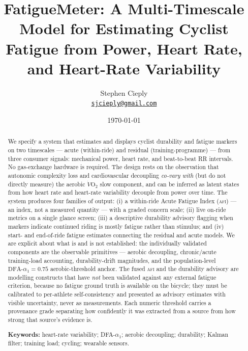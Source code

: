 \documentclass[11pt]{article}
\title{\vspace{-1.5em}\bfseries\color{ink}\LARGE FatigueMeter: A Multi-Timescale Model for Estimating Cyclist Fatigue from Power, Heart Rate, and Heart-Rate Variability}
\author{%
  \normalsize Stephen Cieply\\[2pt]
  \small\texttt{\href{mailto:sjcieply@gmail.com}{sjcieply@gmail.com}}%
}
\date{\today}
\newcommand{\afi}{\textup{\textsc{afi}}}
\newcommand{\aone}{\ensuremath{\text{DFA-}\alpha_1}}
\begin{document}
\maketitle

\begin{abstract}
\noindent We specify a system that estimates and displays cyclist durability and fatigue markers on two timescales --- acute (within-ride) and residual (training-programme) --- from three consumer signals: mechanical power, heart rate, and beat-to-beat RR intervals. No gas-exchange hardware is required. The design rests on the observation that autonomic complexity loss and cardiovascular decoupling \emph{co-vary with} (but do not directly measure) the aerobic $\dot{V}\mathrm{O_2}$ slow component, and can be inferred as latent states from how heart rate and heart-rate variability decouple from power over time. The system produces four families of output: (i) a within-ride Acute Fatigue Index (\afi) --- an index, not a measured quantity --- with a graded concern scale; (ii) live on-ride metrics on a single glance screen; (iii) a descriptive durability advisory flagging when markers indicate continued riding is mostly fatigue rather than stimulus; and (iv) start- and end-of-ride fatigue estimates connecting the residual and acute models. We are explicit about what is and is not established: the individually validated components are the observable primitives --- aerobic decoupling, chronic/acute training-load accounting, durability-drift magnitudes, and the population-level $\aone=0.75$ aerobic-threshold anchor. The fused \afi{} and the durability advisory are modelling constructs that have \emph{not} been validated against any external fatigue criterion, because no fatigue ground truth is available on the bicycle; they must be calibrated to per-athlete self-consistency and presented as advisory estimates with visible uncertainty, never as measurements. Each numeric threshold carries a provenance grade separating how confidently it was extracted from a source from how strong that source's evidence is.

\vspace{0.6em}
\noindent\textbf{Keywords:} heart-rate variability; DFA-$\alpha_1$; aerobic decoupling; durability; Kalman filter; training load; cycling; wearable sensors.
\end{abstract}

\vspace{0.5em}

\end{document}
